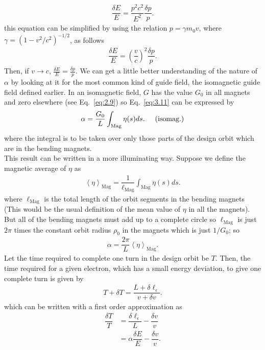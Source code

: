 \begin{align}
	\dfrac{\delta E}{E} = \dfrac{p^2 c^2}{E^2} \dfrac{\delta p}{p}.
\end{align}
this equation can be simplified by using the relation $p = \gamma m_0 v$, where $\gamma = (1 - v^2/c^2)^{-1/2}$, as follows
\begin{align}\label{eq:E=P}
	\dfrac{\delta E}{E} = \left( \dfrac{v}{c} \right)^2 \dfrac{\delta p}{p}.
\end{align}
Then, if $v \to c$, $\frac{\delta E}{E} = \frac{\delta p}{p}$.
We can get a little better understanding of the nature of $\alpha$ by looking at it for the most common kind of guide field, the isomagnetic guide field defined earlier. In an isomagnetic field, $G$ has the value $G_0$ in all magnets and zero elsewhere (see Eq.~\eqref{eq:2.9}) so Eq.~\eqref{eq:3.11} can be expressed by
\begin{align} \label{eq:3.12}
	\alpha = \dfrac{G_0}{L} \int_{\text{Mag}} \eta(s) ds. \hspace{5mm} \text{(isomag.)}
\end{align}
where the integral is to be taken over only those parts of the design orbit which
are in the bending magnets.\\
This result can be written in a more illuminating way. Suppose we define the magnetic average of $\eta$ as
\begin{align} \label{eq:3.13}
	\left\langle \eta \right\rangle_{\text{Mag}} = \dfrac{1}{\ell_{\text{Mag}}} \int_{\text{Mag}} \eta(s) ds.
\end{align}
where $\ell_{\text{Mag}}$ is the total length of the orbit segments in the bending magnets (This would be the usual definition of the mean value of $\eta$ in all the magnets).
But all of the bending magnets must add up to a complete circle so $\ell_{\text{Mag}}$ is just $2\pi$ times the constant orbit radius $\rho_0$ in the magnets which is just $1/G_0$; so
\begin{align} \label{eq:3.14}
	\alpha = \dfrac{2\pi}{L} \left\langle \eta \right\rangle_{\text{Mag}}.
\end{align}
Let the time required to complete one turn in the design orbit be $T$. Then, the time required for a given electron, which has a small energy deviation, to give one complete turn is given by
\begin{align}
	T + \delta T = \dfrac{L + \delta \ell_\epsilon}{v + \delta v}.
\end{align}
which can be written with a first order approximation as
\begin{align}\label{eq:T_E}
	\dfrac{\delta T}{T} &= \dfrac{\delta \ell_\epsilon}{L} - \dfrac{\delta v}{v}\\
    					&= \alpha \dfrac{\delta E}{E} - \dfrac{\delta v}{v}.
\end{align}
